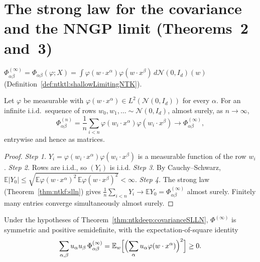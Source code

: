 \section{The strong law for the covariance and the NNGP limit (Theorems~2 and~3)}\label{sec:ntkdeep:nngpLimit}

\begin{definition}\label{def:ntkdeep:limitingCov}
  \leanok
$\Phi^{(\infty)}_{\alpha\beta}=\Phi_{\alpha\beta}(\varphi;X)=\int\varphi(w\cdot x^\alpha)\varphi(w\cdot x^\beta)\,d\mathcal N(0,I_d)(w)$ (Definition~\ref{def:ntktl:shallowLimitingNTK}).
\end{definition}

\begin{theorem}\label{thm:ntkdeep:covarianceSLLN}
  \leanok
Let $\varphi$ be measurable with $\varphi(w\cdot x^\alpha)\in L^2(\mathcal N(0,I_d))$ for every $\alpha$. For an infinite i.i.d.\ sequence of rows $w_0,w_1,\dots\sim\mathcal N(0,I_d)$, almost surely, as $n\to\infty$,
\[
  \Phi^{(n)}_{\alpha\beta}=\frac1n\sum_{i<n}\varphi(w_i\cdot x^\alpha)\varphi(w_i\cdot x^\beta)\longrightarrow\Phi^{(\infty)}_{\alpha\beta},
\]
entrywise and hence as matrices.
\end{theorem}

\begin{proof}
  \leanok
\emph{Step 1.} $Y_i=\varphi(w_i\cdot x^\alpha)\varphi(w_i\cdot x^\beta)$ is a measurable function of the row $w_i$. \emph{Step 2.} Rows are i.i.d., so $(Y_i)$ is i.i.d. \emph{Step 3.} By Cauchy--Schwarz, $\mathbb E|Y_0|\le\sqrt{\mathbb E\varphi(w\cdot x^\alpha)^2\,\mathbb E\varphi(w\cdot x^\beta)^2}<\infty$.
\emph{Step 4.} The strong law (Theorem~\ref{thm:ntkf:slln}) gives $\frac1n\sum_{i<n}Y_i\to\mathbb E Y_0=\Phi^{(\infty)}_{\alpha\beta}$ almost surely. Finitely many entries converge simultaneously almost surely.
\end{proof}

\begin{theorem}\label{thm:ntkdeep:limitingCovPsd}
  \leanok
Under the hypotheses of Theorem~\ref{thm:ntkdeep:covarianceSLLN}, $\Phi^{(\infty)}$ is symmetric and positive semidefinite, with the expectation-of-square identity
\[
  \sum_{\alpha,\beta}u_\alpha u_\beta\,\Phi^{(\infty)}_{\alpha\beta}=\mathbb E_w\Bigl[\Bigl(\sum_\alpha u_\alpha\varphi(w\cdot x^\alpha)\Bigr)^2\Bigr]\ge0 .
\]
\end{theorem}


